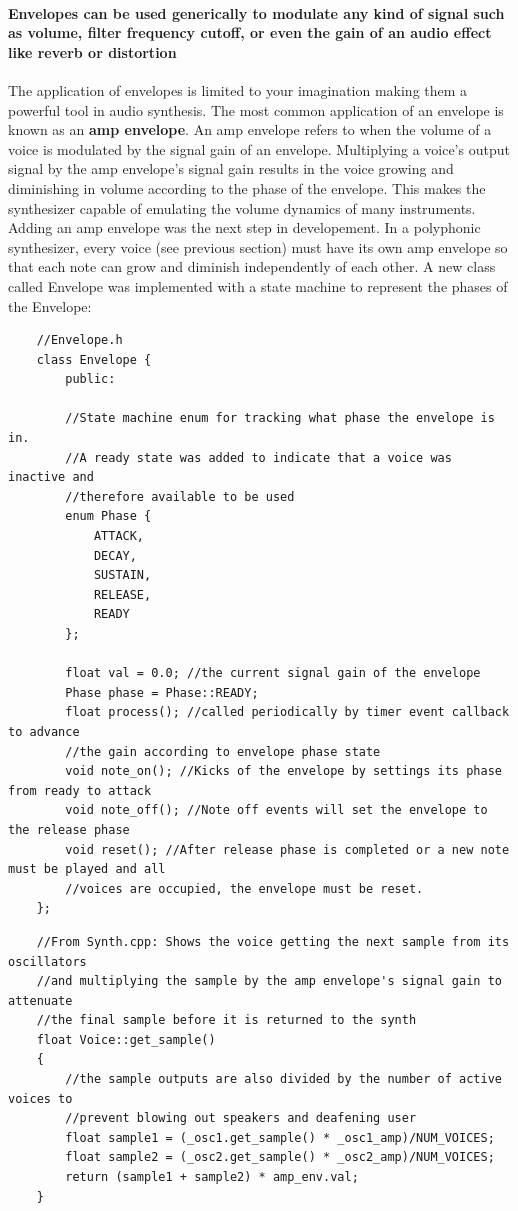 \documentclass[acmlarge,screen]{acmart}
\begin{document}
	\paragraph{Envelopes can be used generically to modulate any kind of signal such as volume, filter frequency cutoff, or even the gain of an audio effect like reverb or distortion} The application of envelopes is limited to your imagination making them a powerful tool in audio synthesis. The most common application of an envelope is known as an \textbf{amp envelope}. An amp envelope refers to when the volume of a voice is modulated by the signal gain of an envelope. Multiplying a voice's output signal by the amp envelope's signal gain results in the voice growing and diminishing in volume according to the phase of the envelope. This makes the synthesizer capable of emulating the volume dynamics of many instruments. Adding an amp envelope was the next step in developement. In a polyphonic synthesizer, every voice (see previous section) must have its own amp envelope so that each note can grow and diminish independently of each other. A new class called Envelope was implemented with a state machine to represent the phases of the Envelope:
	
	\begin{verbatim}
	//Envelope.h
	class Envelope {
		public:
		
		//State machine enum for tracking what phase the envelope is in.
		//A ready state was added to indicate that a voice was inactive and
		//therefore available to be used
		enum Phase {
			ATTACK,
			DECAY,
			SUSTAIN,
			RELEASE,
			READY 
		};
		
		float val = 0.0; //the current signal gain of the envelope
		Phase phase = Phase::READY;
		float process(); //called periodically by timer event callback to advance
		//the gain according to envelope phase state
		void note_on(); //Kicks of the envelope by settings its phase from ready to attack
		void note_off(); //Note off events will set the envelope to the release phase
		void reset(); //After release phase is completed or a new note must be played and all
		//voices are occupied, the envelope must be reset.
	};
	\end{verbatim}
	
	\clearpage
	
	\begin{verbatim}
	//From Synth.cpp: Shows the voice getting the next sample from its oscillators
	//and multiplying the sample by the amp envelope's signal gain to attenuate
	//the final sample before it is returned to the synth
	float Voice::get_sample()
	{   
		//the sample outputs are also divided by the number of active voices to
		//prevent blowing out speakers and deafening user
		float sample1 = (_osc1.get_sample() * _osc1_amp)/NUM_VOICES;
		float sample2 = (_osc2.get_sample() * _osc2_amp)/NUM_VOICES;
		return (sample1 + sample2) * amp_env.val;
	}
	\end{verbatim}
	
\end{document}
